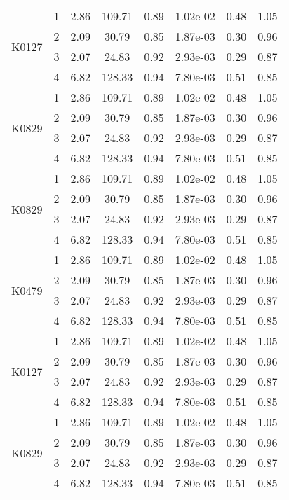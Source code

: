 \documentclass[11pt,a4paper]{article}
\begin{document}
\begin{longtable}{|c|c|c|c|c|c|c|c|}
\multirow{4}{*}{K0127} & 1 & 2.86 & 109.71 & 0.89 & 1.02e-02 & 0.48 & 1.05 \\
& 2 & 2.09 & 30.79 & 0.85 & 1.87e-03 & 0.30 & 0.96 \\
& 3 & 2.07 & 24.83 & 0.92 & 2.93e-03 & 0.29 & 0.87 \\
& 4 & 6.82 & 128.33 & 0.94 & 7.80e-03 & 0.51 & 0.85 \\ \hline

\multirow{4}{*}{K0829} & 1 & 2.86 & 109.71 & 0.89 & 1.02e-02 & 0.48 & 1.05 \\
& 2 & 2.09 & 30.79 & 0.85 & 1.87e-03 & 0.30 & 0.96 \\
& 3 & 2.07 & 24.83 & 0.92 & 2.93e-03 & 0.29 & 0.87 \\
& 4 & 6.82 & 128.33 & 0.94 & 7.80e-03 & 0.51 & 0.85 \\ \hline

\multirow{4}{*}{K0829} & 1 & 2.86 & 109.71 & 0.89 & 1.02e-02 & 0.48 & 1.05 \\
& 2 & 2.09 & 30.79 & 0.85 & 1.87e-03 & 0.30 & 0.96 \\
& 3 & 2.07 & 24.83 & 0.92 & 2.93e-03 & 0.29 & 0.87 \\
& 4 & 6.82 & 128.33 & 0.94& 7.80e-03 & 0.51 & 0.85 \\ \hline

\multirow{4}{*}{K0479} & 1 & 2.86 & 109.71 & 0.89 & 1.02e-02 & 0.48 & 1.05 \\
& 2 & 2.09 & 30.79 & 0.85 & 1.87e-03 & 0.30 & 0.96 \\
& 3 & 2.07 & 24.83 & 0.92 & 2.93e-03 & 0.29 & 0.87 \\
& 4 & 6.82 & 128.33 & 0.94& 7.80e-03 & 0.51 & 0.85 \\ \hline


\multirow{4}{*}{K0127} & 1 & 2.86 & 109.71 & 0.89 & 1.02e-02 & 0.48 & 1.05 \\
& 2 & 2.09 & 30.79 & 0.85 & 1.87e-03 & 0.30 & 0.96 \\
& 3 & 2.07 & 24.83 & 0.92 & 2.93e-03 & 0.29 & 0.87 \\
& 4 & 6.82 & 128.33 & 0.94 & 7.80e-03 & 0.51 & 0.85 \\ \hline

\multirow{4}{*}{K0829} & 1 & 2.86 & 109.71 & 0.89 & 1.02e-02 & 0.48 & 1.05 \\
& 2 & 2.09 & 30.79 & 0.85 & 1.87e-03 & 0.30 & 0.96 \\
& 3 & 2.07 & 24.83 & 0.92 & 2.93e-03 & 0.29 & 0.87 \\
& 4 & 6.82 & 128.33 & 0.94 & 7.80e-03 & 0.51 & 0.85 \\ \hline


\end{longtable}
\end{document}
